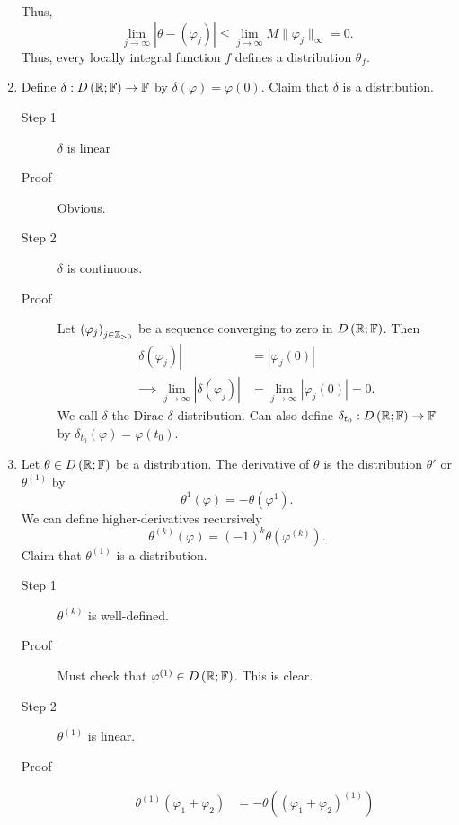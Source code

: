 \begin{example}
\begin{enumerate}
		Thus, 
		\[
			\lim_{j \to \infty} |\theta - \left( \varphi_{j} \right) | \le  \lim_{j \to \infty} M \|\varphi_{j}\|_{\infty} = 0
		.\] 
		Thus, every locally integral function $f$ defines a distribution $\theta _{f}$. 
	\item Define $\delta : D\left( \mathbb{R}; \mathbb{F} \right)  \to \mathbb{F}$ by $\delta\left( \varphi \right)  = \varphi\left( 0 \right) $. Claim that $\delta$ is a distribution. 
		\begin{description}
			\item[Step 1] $\delta $ is linear
			\item[Proof] Obvious. 
			\item[Step 2] $\delta$ is continuous. 
			\item[Proof] Let $\left( \varphi_{j} \right) _{j \in  \mathbb{Z}_{>0}}$ be a sequence converging to zero in $D\left( \mathbb{R}; \mathbb{F} \right) $. Then 
				\begin{align*}
					|		\delta\left( \varphi_{j} \right) | &=  |\varphi_{j}\left( 0  \right) | \\
					\implies \lim_{j \to \infty} \left| \delta\left( \varphi_j \right)  \right|  &= \lim_{j \to \infty} \left| \varphi_{j}\left( 0 \right)  \right|  = 0
				.\end{align*}
				We call  $\delta$ the Dirac $\delta$-distribution. Can also define $\delta_{t_0} : D\left( \mathbb{R}; \mathbb{F} \right)  \to \mathbb{F} $ by $\delta_{t_0} \left( \varphi \right) = \varphi\left( t_0 \right) $. 
		\end{description}
	\item Let $\theta \in  D\left( \mathbb{R}; \mathbb{F} \right) $ be a distribution. The derivative of $\theta$ is the distribution $\theta '$ or $\theta ^{\left( 1 \right) }$ by 
		\[
			\theta ^{1}\left( \varphi \right)  = -\theta\left( \varphi^{1} \right) 
		.\] 
		We can define higher-derivatives recursively 
		\[
			\theta^{\left( k \right) } \left( \varphi \right)  = \left( -1  \right) ^{k} \theta \left( \varphi^{\left( k \right) } \right) 
		.\] 
		Claim that $\theta^{\left( 1 \right) }$ is a distribution. 
		\begin{description}
			\item[Step 1] $\theta^{\left( k \right) }$ is well-defined. 
			\item[Proof] Must check that $\varphi^{\left( 1 \right) }\in D\left( \mathbb{R}; \mathbb{F} \right) $. This is clear. 
			\item[Step 2] $\theta ^{\left( 1 \right) }$ is linear. 
			\item[Proof] 
				\begin{align*}
					\theta^{\left( 1 \right) } \left( \varphi_{1} + \varphi_2 \right) &= - \theta \left( \left( \varphi_1 + \varphi_2 \right) ^{\left( 1 \right) } \right)  \\

\end{align*}
\end{description}
\end{enumerate}
\end{example}
